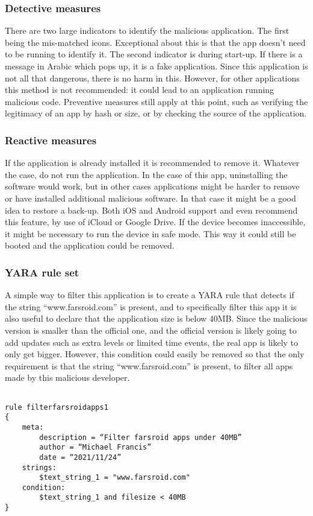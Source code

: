 \subsubsection{Detective measures}

There are two large indicators to identify the malicious application. The first being the mis-matched icons. Exceptional about this is that the app doesn’t need to be running to identify it. The second indicator is during start-up. If there is a message in Arabic which pops up, it is a fake application. Since this application is not all that dangerous, there is no harm in this. However, for other applications this method is not recommended: it could lead to an application running malicious code. Preventive measures still apply at this point, such as verifying the legitimacy of an app by hash or size, or by checking the source of the application.
\subsubsection{Reactive measures}

If the application is already installed it is recommended to remove it. Whatever the case, do not run the application. In the case of this app, uninstalling the software would work, but in other cases applications might be harder to remove or have installed additional malicious software. In that case it might be a good idea to restore a back-up. Both iOS and Android support and even recommend this feature, by use of iCloud or Google Drive. If the device becomes inaccessible, it might be necessary to run the device in safe mode. This way it could still be booted and the application could be removed.
\subsubsection{YARA rule set}

A simple way to filter this application is to create a YARA rule that detects if the string “www.farsroid.com” is present, and to specifically filter this app it is also useful to declare that the application size is below 40MB. Since the malicious version is smaller than the official one, and the official version is likely going to add updates such as extra levels or limited time events, the real app is likely to only get bigger. However, this condition could easily be removed so that the only requirement is that the string “www.farsroid.com” is present, to filter all apps made by this malicious developer.
\begin{verbatim}

rule filterfarsroidapps1
{
    meta:
        description = “Filter farsroid apps under 40MB”
        author = “Michael Francis”
        date = “2021/11/24”
    strings:
        $text_string_1 = "www.farsroid.com"
    condition:
        $text_string_1 and filesize < 40MB
}

\end{verbatim}

